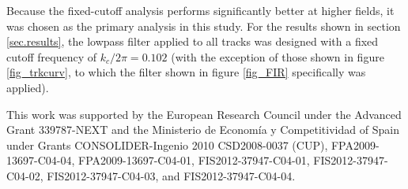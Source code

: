 \documentclass{JINST}
\begin{document}
Because the fixed-cutoff analysis performs significantly better at higher fields, it was chosen as the primary 
analysis in this study.  For the results shown in section \ref{sec.results}, the lowpass filter applied to all tracks 
was designed with a fixed cutoff frequency of $k_{c}/2\pi = 0.102$ (with the exception of those shown in figure \ref{fig_trkcurv}, to which the filter shown in figure \ref{fig_FIR} specifically was applied).




\acknowledgments

This work was supported by the European Research Council under the Advanced Grant 339787-NEXT and the Ministerio de Econom\'{i}a y Competitividad of Spain under Grants CONSOLIDER-Ingenio 2010 CSD2008-0037 (CUP), FPA2009-13697-C04-04, FPA2009-13697-C04-01, FIS2012-37947-C04-01, FIS2012-37947-C04-02, FIS2012-37947-C04-03, and FIS2012-37947-C04-04.


\end{document}
